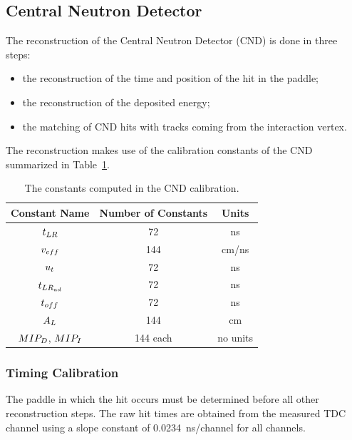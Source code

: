\documentclass{elsart}
\begin{document}
\subsection{Central Neutron Detector}

The reconstruction of the Central Neutron Detector (CND) is done in three steps:

\begin{itemize}
\item{the reconstruction of the time and position of the hit in the paddle;}
\item{the reconstruction of the deposited energy;}
\item{the matching of CND hits with tracks coming from the interaction vertex.}
\end{itemize}

The reconstruction makes use of the calibration constants of the CND summarized in
Table~\ref{table_cnd_constants}.

\begin{table}[htbp]
\begin{center}
\begin{tabular}{|c|c|c|} \hline
Constant Name & Number of Constants  & Units \\ \hline
$t_{\rm{LR}}$ & 72 & ns\\ \hline
$v_{\rm{eff}}$ & 144 & cm/ns \\ \hline
$u_{\rm{t}}$ & 72 & ns \\ \hline
$t_{\rm{LR}_{\rm{ad}}}$ & 72 & ns \\ \hline
$t_{\rm{off}}$ &72 & ns\\ \hline
$A_{\rm{L}}$ & 144 & cm\\ \hline
$MIP_{\rm{D}}$, $MIP_{\rm{I}}$ & 144 each & no units \\ \hline
\end{tabular}
\caption{The constants computed in the CND calibration.}
\label{table_cnd_constants}
\end{center}
\end{table}

\subsubsection{Timing Calibration}

The paddle in which the hit occurs must be determined before all other reconstruction steps. The raw hit
times are obtained from the measured TDC channel using a slope constant of 0.0234~ns/channel for all
channels.
\end{document}
